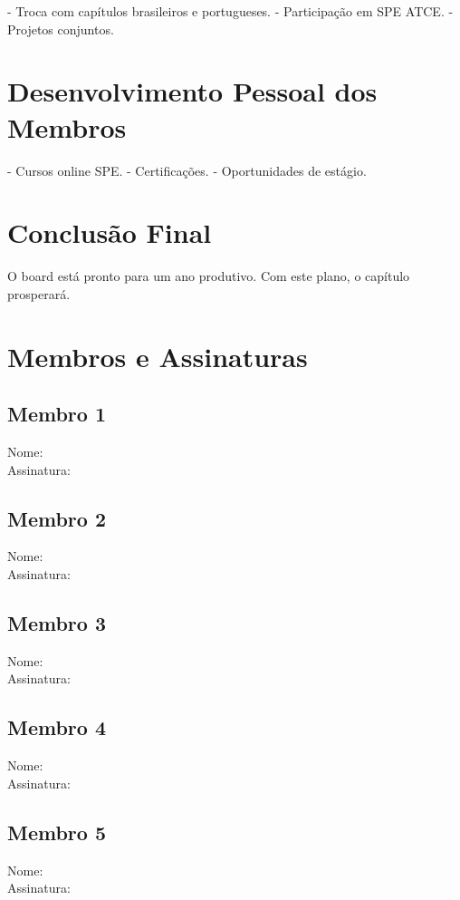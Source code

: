 \documentclass[12pt]{article}
\begin{document}
- Troca com capítulos brasileiros e portugueses.
- Participação em SPE ATCE.
- Projetos conjuntos.

\section{Desenvolvimento Pessoal dos Membros}

- Cursos online SPE.
- Certificações.
- Oportunidades de estágio.

\section{Conclusão Final}

O board está pronto para um ano produtivo. Com este plano, o capítulo prosperará.

\section{Membros e Assinaturas}

\subsection{Membro 1}
Nome: \\
Assinatura: \underline{\hspace{5cm}}

\newpage
\subsection{Membro 2}
Nome: \\
Assinatura: \underline{\hspace{5cm}}

\newpage
\subsection{Membro 3}
Nome: \\
Assinatura: \underline{\hspace{5cm}}

\newpage
\subsection{Membro 4}
Nome: \\
Assinatura: \underline{\hspace{5cm}}

\newpage
\subsection{Membro 5}
Nome: \\
Assinatura: \underline{\hspace{5cm}}
\end{document}
